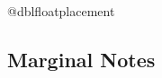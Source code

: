   \begin{docCommand}{@dblfloatplacement} {}
% 
%    
    \begin{teX}  
\def \@dblfloatplacement {%
    \end{teX}
    \begin{teX}  
  \global \@dbltopnum \c@dbltopnumber
  \global \@dbltoproom \dbltopfraction\@colht
    \end{teX}
    \begin{teX}
  \@textmin \@colht
  \advance \@textmin -\@dbltoproom
    \end{teX}
    \begin{teX}
  \@fpmin \dblfloatpagefraction\textheight
  \@fptop \@dblfptop
  \@fpsep \@dblfpsep
  \@fpbot \@dblfpbot
}
    \end{teX}
  \end{docCommand}
%
%
\subsection{Marginal Notes}
\label{ltx:marginalnotes}

